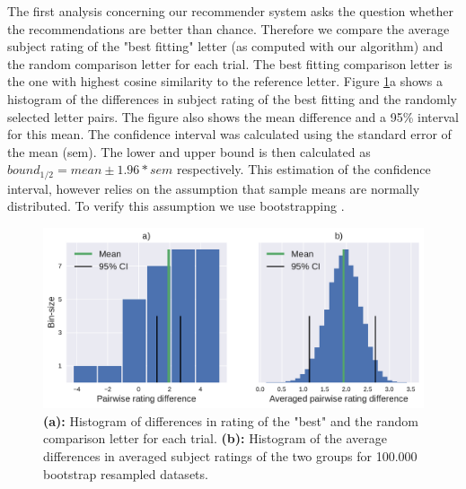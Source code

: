 The first analysis concerning our recommender system asks the question whether the recommendations are better than chance. Therefore we compare the average subject rating of the "best fitting" letter (as computed with our algorithm) and the random comparison letter for each trial. The best fitting comparison letter is the one with highest cosine similarity to the reference letter. %
Figure \ref{fig:both_diff_tf}a shows a histogram of the differences in subject rating of the best fitting and the randomly selected letter pairs. The figure also shows the mean difference and a 95\% interval for this mean. The confidence interval was calculated using the standard error of the mean (sem). The lower and upper bound is then calculated as $bound_{1/2} = mean \pm 1.96 * sem$ respectively. This estimation of the confidence interval, however relies on the assumption that sample means are normally distributed. To verify this assumption we use bootstrapping \citep{Efron1979}.
\begin{figure}[h]
	\includegraphics[width=\textwidth]{figures/both_diff_tf}
	\caption{\textbf{(a):} Histogram of differences in rating of the "best" and the random comparison letter for each trial.
		\textbf{(b):} Histogram of the average differences in averaged subject ratings of the two groups for 100.000 bootstrap resampled datasets.}
	\label{fig:both_diff_tf}
\end{figure}

